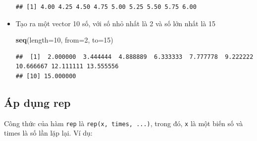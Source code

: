 \documentclass[
]{book}
\newenvironment{Shaded}{\begin{snugshade}}{\end{snugshade}}
\newcommand{\DataTypeTok}[1]{\textcolor[rgb]{0.13,0.29,0.53}{#1}}
\newcommand{\DecValTok}[1]{\textcolor[rgb]{0.00,0.00,0.81}{#1}}
\newcommand{\KeywordTok}[1]{\textcolor[rgb]{0.13,0.29,0.53}{\textbf{#1}}}
\newcommand{\NormalTok}[1]{#1}
\begin{document}
\begin{itemize}
\begin{verbatim}
## [1] 4.00 4.25 4.50 4.75 5.00 5.25 5.50 5.75 6.00
\end{verbatim}
\item
  Tạo ra một vector 10 số, với số nhỏ nhất là 2 và số lớn nhất là 15

\begin{Shaded}
\begin{Highlighting}[]
\KeywordTok{seq}\NormalTok{(}\DataTypeTok{length=}\DecValTok{10}\NormalTok{, }\DataTypeTok{from=}\DecValTok{2}\NormalTok{, }\DataTypeTok{to=}\DecValTok{15}\NormalTok{)}
\end{Highlighting}
\end{Shaded}

\begin{verbatim}
##  [1]  2.000000  3.444444  4.888889  6.333333  7.777778  9.222222 10.666667 12.111111 13.555556
## [10] 15.000000
\end{verbatim}
\end{itemize}

\hypertarget{uxe1p-dux1ee5ng-rep}{%
\subsection*{Áp dụng rep}\label{uxe1p-dux1ee5ng-rep}}

Công thức của hàm \texttt{rep} là \texttt{rep(x,\ times,\ ...)}, trong đó, \texttt{x} là một biến số và times là số lần lặp lại. Ví dụ:
\end{document}
